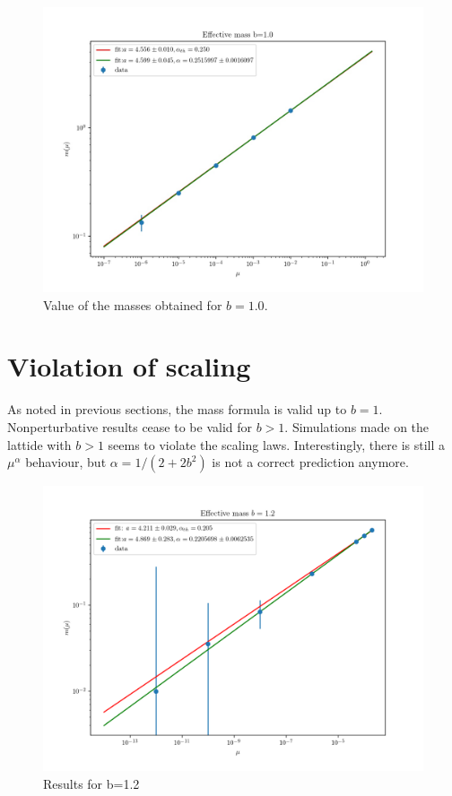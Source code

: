 \documentclass[12pt,a4paper]{report}
\begin{document}
 \begin{figure}
\label{fig:mass_scaling_b1.50}
\centering
\includegraphics[width=1.0\textwidth]{b1_0}
\caption{Value of the masses obtained for $b=1.0$.}
\end{figure}

 
 \section{Violation of scaling}
 
As noted in previous sections, the mass formula is valid up to $b=1$. Nonperturbative results  cease to be valid for $b>1$. Simulations made on the lattide with $b>1$ seems to violate the scaling laws. Interestingly, there is still a $\mu^\alpha$ behaviour, but $\alpha= 1/(2+2b^2)$ is not a correct prediction anymore.


\begin{figure}
\centering
\includegraphics[width=1.0\textwidth]{b1_2}
\caption{Results for b=1.2}
\label{fig:mass_scaling_b1.2}
\end{figure}
 
\end{document}
